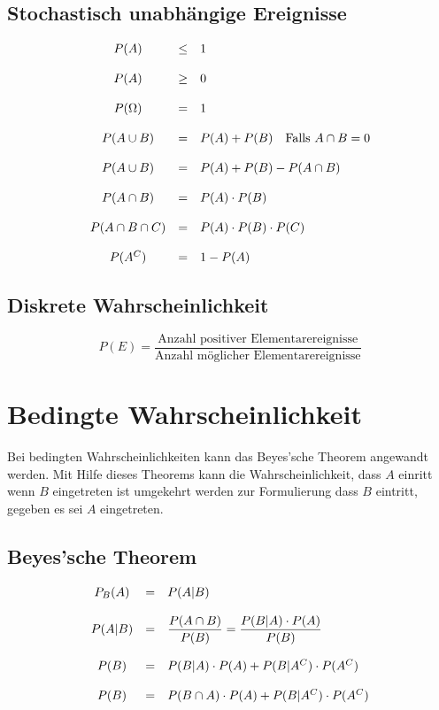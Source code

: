 \subsection{Stochastisch unabhängige Ereignisse}
\[ \begin{array}{c c l}
	P(A)	
		& \leq
		& 1 \\
	& & \\
	P(A) 
		& \geq 
		& 0 \\
	& & \\
	P(\Omega) 
		& = 
		& 1 \\
	& & \\
	P(A \cup B) 
		& = 
		& P(A) + P(B) \quad \text{Falls } A \cap B = 0 \\
	& & \\
	P(A \cup B) 
		& = 
		& P(A) + P(B) - P(A \cap B) \\
	& & \\
	P(A \cap B) 
		& = 
		& P(A) \cdot P(B) \\
	& & \\
	P(A \cap B \cap C) 
		& = 
		& P(A) \cdot P(B) \cdot P(C) \\
	& & \\
	P(A^C) 
		& = 
		& 1 - P(A)
\end{array} \]
	
\subsection{Diskrete Wahrscheinlichkeit}
\[ 
	P(E)
	= \frac{\text{Anzahl positiver Elementarereignisse}}{
		\text{Anzahl möglicher Elementarereignisse}}
\]

\section{Bedingte Wahrscheinlichkeit}
Bei bedingten Wahrscheinlichkeiten kann das Beyes'sche Theorem angewandt
werden. Mit Hilfe dieses Theorems kann die Wahrscheinlichkeit, dass $A$
einritt wenn $B$ eingetreten ist umgekehrt werden zur Formulierung dass
$B$ eintritt, gegeben es sei $A$ eingetreten.

\subsection{Beyes'sche Theorem}
\[ \begin{array}{c c l}
	P_B(A) 
		& = 
		& P(A|B) \\
	& & \\
	P(A|B)
		& = 
		& \displaystyle \frac{P(A \cap B)}{P(B)} 
			= \displaystyle 
			\frac{P(B|A) \cdot P(A)}{P(B)} \\
	& & \\
	P(B) 
		& = 
		& P(B|A) \cdot P(A) + P(B|A^C) \cdot P(A^C) \\
	& & \\
	P(B) 	
		& = 
		& P(B \cap A) \cdot P(A) + P(B|A^C) \cdot P(A^C)
\end{array} \]

